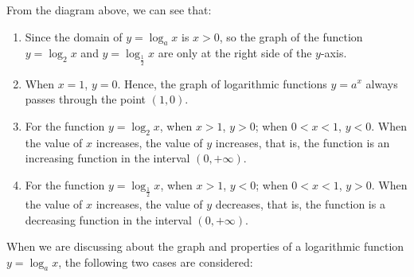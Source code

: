 \documentclass[12pt]{report}
\begin{document}
From the diagram above, we can see that:
\begin{enumerate}[label=(\arabic*)]
    \item Since the domain of $y = \log_a x$ is $x > 0$, so the graph of the function $y
              = \log_2 x$ and $y = \log_\frac{1}{2} x$ are only at the right side of the
          $y$-axis.
    \item When $x = 1$, $y = 0$. Hence, the graph of logarithmic functions $y = a^x$
          always passes through the point $(1, 0)$.

    \item For the function $y = \log_2 x$, when $x > 1$, $y > 0$; when $0 < x < 1$, $y <
              0$. When the value of $x$ increases, the value of $y$ increases, that is, the
          function is an increasing function in the interval $(0, +\infty)$.

    \item For the function $y = \log_\frac{1}{2} x$, when $x > 1$, $y < 0$; when $0 < x <
              1$, $y > 0$. When the value of $x$ increases, the value of $y$ decreases, that
          is, the function is a decreasing function in the interval $(0, +\infty)$.
\end{enumerate}

\newpage
When we are discussing about the graph and properties of a logarithmic function
$y = \log_a x$, the following two cases are considered:
\end{document}

